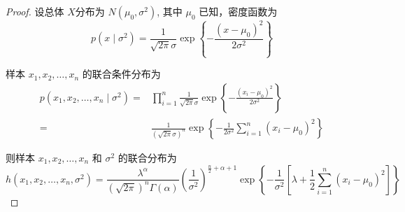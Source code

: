 \documentclass[normal,founder,mtpro2,cn]{elegantnote}
\begin{document}
\begin{enumerate}
\begin{proof}
            设总体 $X$分布为 $N\left(\mu_{0},\sigma^{2}\right)$, 其中 $\mu_{0}$ 已知，密度函数为
            \begin{equation*}
                p\left(x\mid\sigma^{2}\right)=\frac{1}{\sqrt{2\pi}\sigma}\exp\left\{-\frac{\left(x-\mu_{0}\right)^{2}}{2\sigma^{2}}\right\}
            \end{equation*}

            样本 $x_{1},x_{2},\ldots,x_{n}$ 的联合条件分布为
            \begin{equation*}
                \begin{aligned}
                    p\left(x_{1},x_{2},\ldots,x_{n}\mid\sigma^{2}\right)= & \prod_{i=1}^{n}\frac{1}{\sqrt{2\pi}\sigma}\exp\left\{-\frac{\left(x_{i}-\mu_{0}\right)^{2}}{2\sigma^{2}}\right\}                  \\
                    =                                                     & \frac{1}{\left(\sqrt{2\pi}\sigma\right)^{n}}\exp\left\{-\frac{1}{2\sigma^{2}}\sum_{i=1}^{n}\left(x_{i}-\mu_{0}\right)^{2}\right\}
                \end{aligned}
            \end{equation*}

            则样本 $x_{1},x_{2},\ldots,x_{n}$ 和 $\sigma^{2}$ 的联合分布为
            \begin{equation*}
                h\left(x_{1},x_{2},\ldots,x_{n},\sigma^{2}\right)=\frac{\lambda^{\alpha}}{(\sqrt{2\pi})^{n}\Gamma(\alpha)}\left(\frac{1}{\sigma^{2}}\right)^{\frac{n}{2}+\alpha+1}\exp\left\{-\frac{1}{\sigma^{2}}\left[\lambda+\frac{1}{2}\sum_{i=1}^{n}\left(x_{i}-\mu_{0}\right)^{2}\right]\right\}
            \end{equation*}


\end{proof}
\end{enumerate}
\end{document}
